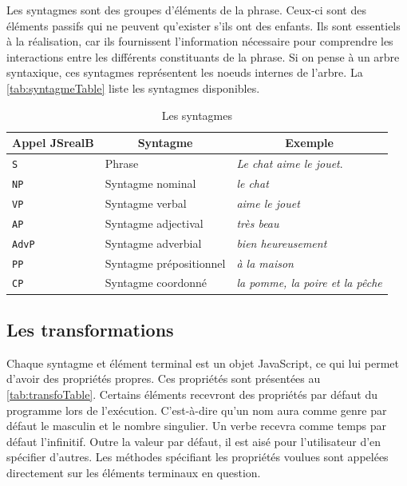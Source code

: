 \documentclass[11pt]{article} %
\newcommand{\system}[1]{\textsf{#1}}
\newcommand{\JSB}{\system{JSrealB}}
\newcommand{\real}[1]{\emph{#1}}
\begin{document}
Les syntagmes sont des groupes d'éléments de la phrase. Ceux-ci sont
des éléments passifs qui ne peuvent qu'exister s'ils ont des enfants.
Ils sont essentiels à la réalisation, car ils fournissent l'information
nécessaire pour comprendre les interactions entre les différents constituants
de la phrase. Si on pense à un arbre syntaxique, ces syntagmes représentent
les noeuds internes de l'arbre. La \autoref{tab:syntagmeTable} liste les syntagmes disponibles.
\begin{table}[ht]
\centering
\caption{Les syntagmes}
\begin{tabular}{|l|l|l|}
\hline 
\multicolumn{1}{|c}{Appel \JSB{}}  & \multicolumn{1}{|c}{Syntagme} & \multicolumn{1}{|c|}{Exemple}\\
\hline 
\hline 
\texttt{S} & Phrase & \real{Le chat aime le jouet}.\\
\hline 
\texttt{NP} & Syntagme nominal & \real{le chat}\\
\hline 
\texttt{VP} & Syntagme verbal & \real{aime le jouet}\\
\hline 
\texttt{AP} & Syntagme adjectival & \real{très beau}\\
\hline 
\texttt{AdvP} & Syntagme adverbial & \real{bien heureusement}\\
\hline 
\texttt{PP} & Syntagme prépositionnel & \real{à la maison}\\
\hline 
\texttt{CP} & Syntagme coordonné & \real{la pomme, la poire et la pêche}\\
\hline 
\end{tabular}

\label{tab:syntagmeTable}
\end{table}

\pagebreak{}
\subsection{Les transformations}

Chaque syntagme et élément terminal est un objet JavaScript, ce qui
lui permet d'avoir des propriétés propres. Ces propriétés sont présentées
au \autoref{tab:transfoTable}.
Certains éléments recevront des propriétés par défaut du programme
lors de l'exécution. C'est-à-dire qu'un nom aura comme genre par défaut
le masculin et le nombre singulier. Un verbe recevra comme temps par
défaut l'infinitif. Outre la valeur par défaut, il est aisé pour
l'utilisateur d'en spécifier d'autres. Les méthodes spécifiant les
propriétés voulues sont appelées directement sur les éléments terminaux
en question. 
\end{document}
